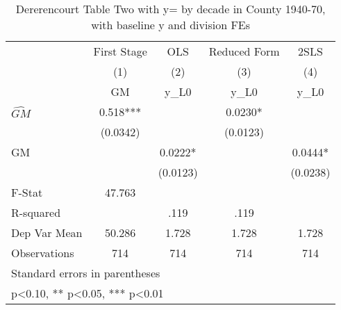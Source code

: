 \begin{table}[htbp]\centering
\def\sym#1{\ifmmode^{#1}\else\(^{#1}\)\fi}
\caption{Dererencourt Table Two with y= by decade in County 1940-70, with baseline y and division FEs}
\begin{tabular}{l*{4}{c}}
\toprule
                    & First Stage   &         OLS   &Reduced Form   &        2SLS   \\
                    &\multicolumn{1}{c}{(1)}&\multicolumn{1}{c}{(2)}&\multicolumn{1}{c}{(3)}&\multicolumn{1}{c}{(4)}\\
                    &\multicolumn{1}{c}{GM}&\multicolumn{1}{c}{y\_L0}&\multicolumn{1}{c}{y\_L0}&\multicolumn{1}{c}{y\_L0}\\
\midrule
$\hat{GM}$          &       0.518***&               &      0.0230*  &               \\
                    &    (0.0342)   &               &    (0.0123)   &               \\
\addlinespace
GM                  &               &      0.0222*  &               &      0.0444*  \\
                    &               &    (0.0123)   &               &    (0.0238)   \\
\midrule
F-Stat              &      47.763   &               &               &               \\
R-squared           &               &        .119   &        .119   &               \\
Dep Var Mean        &      50.286   &       1.728   &       1.728   &       1.728   \\
Observations        &         714   &         714   &         714   &         714   \\
\bottomrule
\multicolumn{5}{l}{\footnotesize Standard errors in parentheses}\\
\multicolumn{5}{l}{\footnotesize * p<0.10, ** p<0.05, *** p<0.01}\\
\end{tabular}
\end{table}
